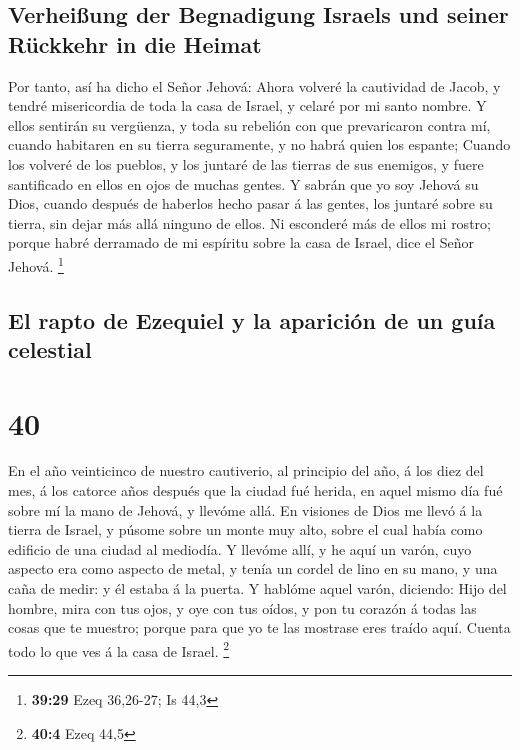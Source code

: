 \hypertarget{verheiuxdfung-der-begnadigung-israels-und-seiner-ruxfcckkehr-in-die-heimat}{%
\subsection{Verheißung der Begnadigung Israels und seiner Rückkehr in
die
Heimat}\label{verheiuxdfung-der-begnadigung-israels-und-seiner-ruxfcckkehr-in-die-heimat}}

 Por tanto, así ha dicho el Señor Jehová: Ahora volveré la
cautividad de Jacob, y tendré misericordia de toda la casa de Israel, y
celaré por mi santo nombre.  Y ellos sentirán su vergüenza,
y toda su rebelión con que prevaricaron contra mí, cuando habitaren en
su tierra seguramente, y no habrá quien los espante; 
Cuando los volveré de los pueblos, y los juntaré de las tierras de sus
enemigos, y fuere santificado en ellos en ojos de muchas gentes.
 Y sabrán que yo soy Jehová su Dios, cuando después de
haberlos hecho pasar á las gentes, los juntaré sobre su tierra, sin
dejar más allá ninguno de ellos.  Ni esconderé más de ellos
mi rostro; porque habré derramado de mi espíritu sobre la casa de
Israel, dice el Señor Jehová. \footnote{\textbf{39:29} Ezeq 36,26-27; Is
  44,3}

\hypertarget{el-rapto-de-ezequiel-y-la-apariciuxf3n-de-un-guuxeda-celestial}{%
\subsection{El rapto de Ezequiel y la aparición de un guía
celestial}\label{el-rapto-de-ezequiel-y-la-apariciuxf3n-de-un-guuxeda-celestial}}

\hypertarget{section-39}{%
\section{40}\label{section-39}}

 En el año veinticinco de nuestro cautiverio, al principio
del año, á los diez del mes, á los catorce años después que la ciudad
fué herida, en aquel mismo día fué sobre mí la mano de Jehová, y llevóme
allá.  En visiones de Dios me llevó á la tierra de Israel, y
púsome sobre un monte muy alto, sobre el cual había como edificio de una
ciudad al mediodía.  Y llevóme allí, y he aquí un varón,
cuyo aspecto era como aspecto de metal, y tenía un cordel de lino en su
mano, y una caña de medir: y él estaba á la puerta.  Y
hablóme aquel varón, diciendo: Hijo del hombre, mira con tus ojos, y oye
con tus oídos, y pon tu corazón á todas las cosas que te muestro; porque
para que yo te las mostrase eres traído aquí. Cuenta todo lo que ves á
la casa de Israel. \footnote{\textbf{40:4} Ezeq 44,5}

